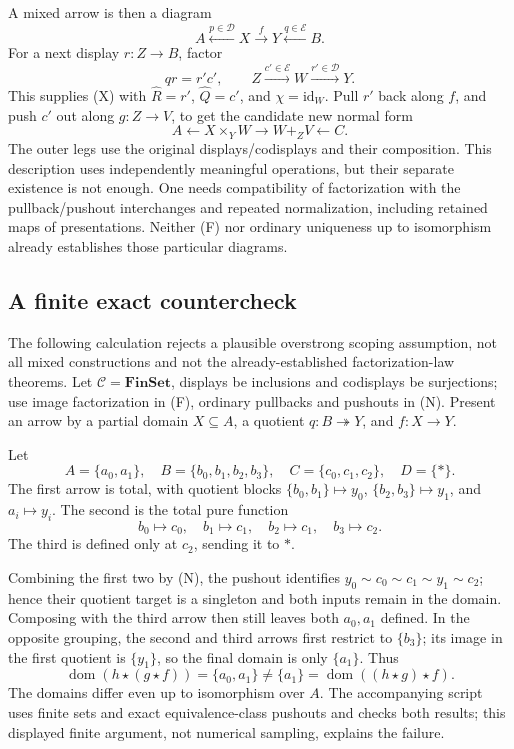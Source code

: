 \documentclass[11pt,a4paper]{article}
\newcommand{\FinSet}{\mathbf{FinSet}}
\newcommand{\id}{\mathrm{id}}
\newcommand{\E}{\mathcal E}
\newcommand{\D}{\mathcal D}
\newcommand{\C}{\mathcal C}
\begin{document}
A mixed arrow is then a diagram
\[
 A\xleftarrow{p\in\D}X\xrightarrow{f}Y\xleftarrow{q\in\E}B.
\]
For a next display \(r:Z\to B\), factor
\[
 q r=r'c',\qquad Z\xrightarrow{c'\in\E}W\xrightarrow{r'\in\D}Y.
 \tag{F}
\]
This supplies (X) with \(\widehat R=r'\), \(\widehat Q=c'\), and
\(\chi=\id_W\). Pull \(r'\) back along \(f\), and push \(c'\) out along
\(g:Z\to V\), to get the candidate new normal form
\[
 A\longleftarrow X\times_Y W\longrightarrow W+_ZV\longleftarrow C.
 \tag{N}
\]
The outer legs use the original displays/codisplays and their composition.
This description uses independently meaningful operations, but their separate
existence is not enough. One needs compatibility of factorization with the
pullback/pushout interchanges and repeated normalization, including retained
maps of presentations. Neither (F) nor ordinary uniqueness up to isomorphism
already establishes those particular diagrams.

\subsection{A finite exact countercheck}

The following calculation rejects a plausible overstrong scoping assumption,
not all mixed constructions and not the already-established factorization-law
theorems. Let \(\C=\FinSet\), displays be inclusions and codisplays be
surjections; use image factorization in (F), ordinary pullbacks and pushouts in
(N). Present an arrow by a partial domain \(X\subseteq A\), a quotient
\(q:B\twoheadrightarrow Y\), and \(f:X\to Y\).

Let
\[
 A=\{a_0,a_1\},\quad B=\{b_0,b_1,b_2,b_3\},\quad
 C=\{c_0,c_1,c_2\},\quad D=\{*\}.
\]
The first arrow is total, with quotient blocks
\(\{b_0,b_1\}\mapsto y_0\), \(\{b_2,b_3\}\mapsto y_1\), and
\(a_i\mapsto y_i\). The second is the total pure function
\[
 b_0\mapsto c_0,\quad b_1\mapsto c_1,\quad
 b_2\mapsto c_1,\quad b_3\mapsto c_2.
\]
The third is defined only at \(c_2\), sending it to \(*\).

Combining the first two by (N), the pushout identifies
\(y_0\sim c_0\sim c_1\sim y_1\sim c_2\); hence their quotient target is a
singleton and both inputs remain in the domain. Composing with the third arrow
then still leaves both \(a_0,a_1\) defined. In the opposite grouping, the
second and third arrows first restrict to \(\{b_3\}\); its image in the first
quotient is \(\{y_1\}\), so the final domain is only \(\{a_1\}\).
Thus
\[
 \operatorname{dom}(h\star(g\star f))=\{a_0,a_1\}
 \ne\{a_1\}=\operatorname{dom}((h\star g)\star f).
\]
The domains differ even up to isomorphism over \(A\). The accompanying script
uses finite sets and exact equivalence-class pushouts and checks both results;
this displayed finite argument, not numerical sampling, explains the failure.
\end{document}
